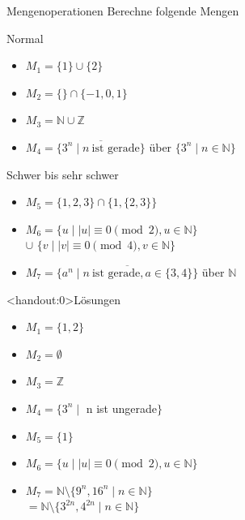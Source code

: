 {
\begin{frame}{Mengenoperationen}
    Berechne folgende Mengen
    \begin{alertblock}{Normal}
        \begin{itemize}
            \item $M_1 = \{1\}\cup \{2\}$
            \item $M_2 = \{\} \cap \{-1, 0, 1\}$
            \item $M_3 = \mathbb{N} \cup \mathbb{Z}$
            \item $M_4 = \overline{\{3^{n}\mid n \ \text{ist gerade}\} }$ über $\{3^{n}\mid n \in \mathbb{N}\}$
        \end{itemize}
    \end{alertblock}
    \begin{alertblock}{Schwer bis sehr schwer}
        \begin{itemize}
            \item $M_5 = \{1, 2, 3\} \cap  \{1, \{2, 3\}\}$
            \item $M_6 = \{u \mid |u| \equiv 0 \pmod 2, u \in \mathbb{N}\}$\\\hspace{0.65cm}$\cup$ $\{v \mid |v| \equiv 0 \pmod 4, v \in \mathbb{N}\}$
            \item $M_7 = \overline{\{a^{n} \mid n \ \text{ist gerade}, a \in \{3,4\}\}}$ über $\mathbb{N}$
        \end{itemize}
    \end{alertblock}
\end{frame}

\begin{frame}<handout:0>{Lösungen}
    \begin{itemize}[<+- | alert@+>]
        \item
              $M_1 = \{1, 2\}$
        \item
              $M_2 = \emptyset$
        \item
              $M_3 = \mathbb{Z}$
        \item
              $M_4 = \{3^{n} \mid$ n ist ungerade$\}$
        \item
              $M_5 = \{1\}$
        \item
              $M_6 = \{u \mid |u| \equiv 0 \pmod 2, u \in \mathbb{N}\}$
        \item
              $M_7 = \mathbb{N} \setminus \{9^n, 16^n \mid n \in \mathbb N\}$\\
              \hspace{0.44cm}$ = \mathbb{N} \setminus \{3^{2n}, 4^{2n} \mid n \in \mathbb N\}$
    \end{itemize}
\end{frame}
}
